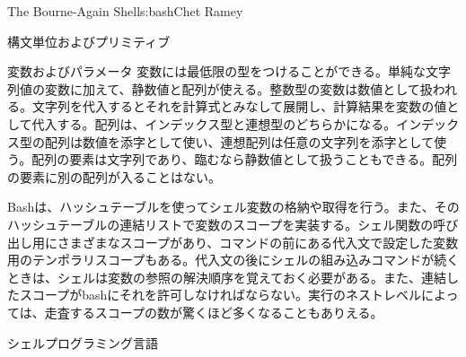 \begin{aosachapter}{The Bourne-Again Shell}{s:bash}{Chet Ramey}
\begin{aosasect1}{構文単位およびプリミティブ}
\begin{aosasect2}{変数およびパラメータ}
変数には最低限の型をつけることができる。単純な文字列値の変数に加えて、静数値と配列が使える。整数型の変数は数値として扱われる。文字列を代入するとそれを計算式とみなして展開し、計算結果を変数の値として代入する。配列は、インデックス型と連想型のどちらかになる。インデックス型の配列は数値を添字として使い、連想配列は任意の文字列を添字として使う。配列の要素は文字列であり、臨むなら静数値として扱うこともできる。配列の要素に別の配列が入ることはない。

Bashは、ハッシュテーブルを使ってシェル変数の格納や取得を行う。また、そのハッシュテーブルの連結リストで変数のスコープを実装する。シェル関数の呼び出し用にさまざまなスコープがあり、コマンドの前にある代入文で設定した変数用のテンポラリスコープもある。代入文の後にシェルの組み込みコマンドが続くときは、シェルは変数の参照の解決順序を覚えておく必要がある。また、連結したスコープがbashにそれを許可しなければならない。実行のネストレベルによっては、走査するスコープの数が驚くほど多くなることもありえる。

\end{aosasect2}

\begin{aosasect2}{シェルプログラミング言語}


\end{aosasect2}
\end{aosasect1}
\end{aosachapter}
